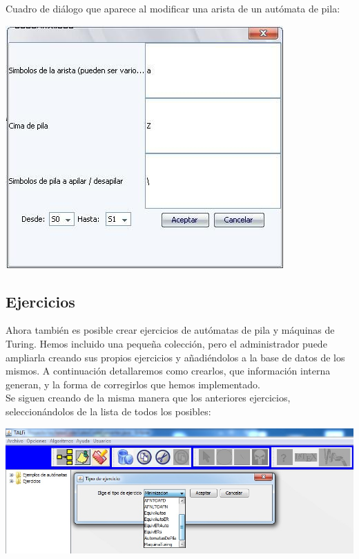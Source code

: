 \documentclass[12pt,a4paper,spanish]{book}
\begin{document}
\newpage
Cuadro de di\'{a}logo que aparece al modificar una arista de un aut\'omata de pila:\\
\begin{center}
\includegraphics[scale=0.6]{roci6.jpg}
\end{center}



\subsection{Ejercicios\\}
Ahora tambi\'en es posible crear ejercicios de aut\'omatas de pila y m\'aquinas de Turing. Hemos incluido una peque\~na colecci\'on, pero el administrador puede ampliarla creando sus propios ejercicios y a\~nadi\'endolos a la base de datos de los mismos. A continuaci\'on detallaremos como crearlos, que informaci\'on interna generan, y la forma de corregirlos que hemos implementado.\\
Se siguen creando de la misma manera que los anteriores ejercicios,\\ seleccion\'andolos de la lista de todos los posibles:
\begin{center}
\includegraphics[width=\textwidth]{ejer1.jpg}
\end{center}
\end{document}
